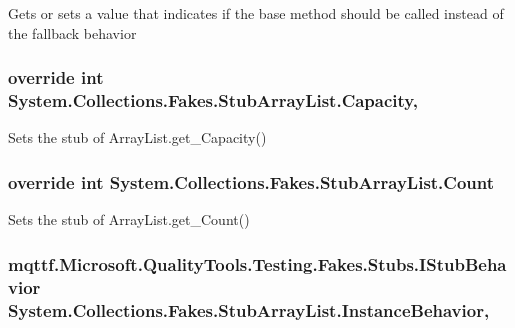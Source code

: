 Gets or sets a value that indicates if the base method should be called instead of the fallback behavior

\hypertarget{class_system_1_1_collections_1_1_fakes_1_1_stub_array_list_a7c50402e6dd03b1627e1b56a29aa2ed0}{
\subsubsection[{Capacity}]{\setlength{\rightskip}{0pt plus 5cm}override int System.\-Collections.\-Fakes.\-Stub\-Array\-List.\-Capacity\hspace{0.3cm}{\ttfamily [get]}, {\ttfamily [set]}}}\label{class_system_1_1_collections_1_1_fakes_1_1_stub_array_list_a7c50402e6dd03b1627e1b56a29aa2ed0}


Sets the stub of Array\-List.\-get\-\_\-\-Capacity()

\hypertarget{class_system_1_1_collections_1_1_fakes_1_1_stub_array_list_ae40e82e4759e44047bbad97fb5b0670d}{
\subsubsection[{Count}]{\setlength{\rightskip}{0pt plus 5cm}override int System.\-Collections.\-Fakes.\-Stub\-Array\-List.\-Count\hspace{0.3cm}{\ttfamily [get]}}}\label{class_system_1_1_collections_1_1_fakes_1_1_stub_array_list_ae40e82e4759e44047bbad97fb5b0670d}


Sets the stub of Array\-List.\-get\-\_\-\-Count()

\hypertarget{class_system_1_1_collections_1_1_fakes_1_1_stub_array_list_a301ae3cf0a0f29a6445d04ba85b3a143}{
\subsubsection[{Instance\-Behavior}]{\setlength{\rightskip}{0pt plus 5cm}mqttf.\-Microsoft.\-Quality\-Tools.\-Testing.\-Fakes.\-Stubs.\-I\-Stub\-Behavior System.\-Collections.\-Fakes.\-Stub\-Array\-List.\-Instance\-Behavior\hspace{0.3cm}{\ttfamily [get]}, {\ttfamily [set]}}}\label{class_system_1_1_collections_1_1_fakes_1_1_stub_array_list_a301ae3cf0a0f29a6445d04ba85b3a143}


